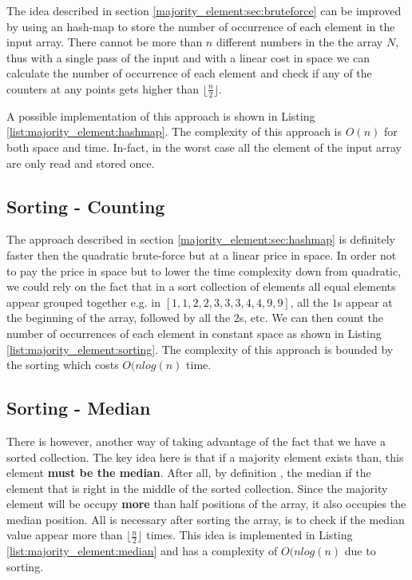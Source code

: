 The idea described in section \ref{majority_element:sec:bruteforce} can be improved by using an hash-map to store the number of occurrence of each element in the input array. There cannot be more than $n$ different numbers in the the array $N$, thus with a single pass of the input and with a linear cost in space we can calculate the number of occurrence of each element and check if any of the counters at any points gets higher than $\lfloor \frac{n}{2} \rfloor$.

A possible implementation of this approach is shown in Listing \ref{list:majority_element:hashmap}.
The complexity of this approach is $O(n)$ for both space and time. In-fact, in the worst case all the element of the input array are only read and stored once.



\subsection{Sorting - Counting}
\label{majority_element:sec:sorting}
The approach described in section \ref{majority_element:sec:hashmap} is definitely faster then the quadratic brute-force but at a linear price in space. In order not to pay the price in space but to lower the time complexity down from quadratic, we could rely on the fact that in a sort collection of elements all equal elements appear grouped together e.g. in $[1,1,2,2,3,3,3,4,4,9,9]$, all the $1$s appear at the beginning of the array, followed by all the $2$s, etc. We can then count the number of occurrences of each element in constant space as shown in Listing \ref{list:majority_element:sorting}. The complexity of this approach is bounded by the sorting which costs $O(nlog(n)$ time.



\subsection{Sorting - Median}
\label{majority_element:sec:median}
There is however, another way of taking advantage of the fact that we have a sorted collection. The key idea here is that if a majority element exists than, this element \textbf{must be the median}. After all, by definition , the median if the element that is right in the middle of the sorted collection. Since the majority element will be occupy \textbf{more} than half positions of the array, it also occupies the median position.
All is necessary after sorting the array, is to check if the median value appear more than $\lfloor \frac{n}{2} \rfloor$ times. 
This idea is implemented in Listing \ref{list:majority_element:median} and has a complexity of $O(nlog(n)$ due to sorting.

